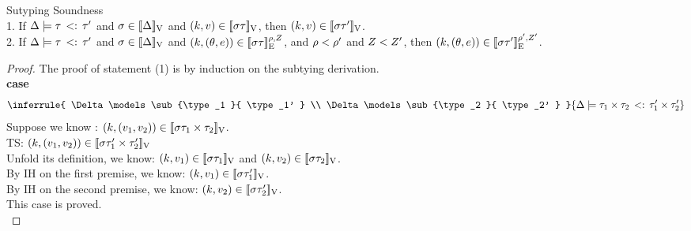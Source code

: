 \begin{lem}\label{lem:sub_sound} \textsf{Sutyping Soundness} \\
1. If $ \Delta \models  \tau  \, <: \,  \tau'  $ and $ \sigma \in [\![ \Delta ]\!]_{\text{V}}$ and  $(k, v) \in [\![ \sigma \tau ]\!]_{\text{V}}$,  then  $(k, v) \in [\![ \sigma \tau' ]\!]_{\text{V}}$.
  \\
 2. If $ \Delta \models  \tau  \, <: \,  \tau'  $ and $ \sigma \in
 [\![ \Delta ]\!]_{\text{V}}$ and  $(k, (\theta, e)) \in
 [\![ \sigma \tau ]\!]_{\text{E}}^{\rho, Z}$, and $\rho < \rho'$ and $Z < Z' $,  then  $(k, (\theta, e)) \in [\![ \sigma \tau' ]\!]_{\text{E}}^{\rho', Z'}$.
   \\
\end{lem}
%
\begin{proof} The proof of statement (1) is by induction on the
  subtying derivation.\\
\textbf{case}
\[ 
 \inferrule{
     \Delta \models \sub{\type_1 }{ \type_1'  } \\
         \Delta \models \sub{\type_2 }{ \type_2'  }
    }{
       \Delta \models \sub{\type_1 \times \type_2 }{ \type_1' \times \type_2'  }
    }
\]
Suppose we know : $ (k, (v_1, v_2)) \in [\![ \sigma \tau_1 \times \tau_2 ]\!]_{\text{V}} $.\\
TS:  $ (k, (v_1, v_2)) \in [\![ \sigma \tau_1' \times \tau_2' ]\!]_{\text{V}} $ \\
Unfold its definition, we know: $  (k, v_1 ) \in [\![ \sigma \tau_1 ]\!]_{\text{V}} $ and $  (k, v_2 ) \in [\![ \sigma \tau_2 ]\!]_{\text{V}} $.\\
By IH on the first premise, we know: $  (k, v_1 ) \in [\![ \sigma \tau_1' ]\!]_{\text{V}} $.\\
By IH on the second premise, we know: $  (k, v_2 ) \in [\![ \sigma \tau_2' ]\!]_{\text{V}} $.\\
This case is proved.\\


\end{proof}

